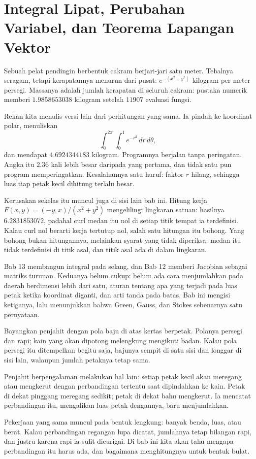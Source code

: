 \chapter[Integral Lipat dan Teorema Lapangan Vektor]{Integral Lipat, Perubahan Variabel, dan Teorema Lapangan Vektor}

Sebuah pelat pendingin berbentuk cakram berjari-jari satu meter. Tebalnya
seragam, tetapi kerapatannya menurun dari pusat: $e^{-(x^{2}+y^{2})}$ kilogram
per meter persegi. Massanya adalah jumlah kerapatan di seluruh cakram: pustaka numerik memberi
$1.9858653038$ kilogram setelah $11907$ evaluasi fungsi.

Rekan kita menulis versi lain dari perhitungan yang sama. Ia pindah ke
koordinat polar, menuliskan
\[
\int_{0}^{2\pi}\!\!\int_{0}^{1} e^{-r^{2}}\,dr\,d\theta ,
\]
dan mendapat $4.6924344183$ kilogram. Programnya berjalan tanpa peringatan.
Angka itu $2.36$ kali lebih besar daripada yang pertama, dan tidak satu pun
program memperingatkan. Kesalahannya satu huruf: faktor $r$ hilang, sehingga luas
tiap petak kecil dihitung terlalu besar.

Kerusakan sekelas itu muncul juga di sisi lain bab ini. Hitung kerja
$F(x,y)=(-y,x)/(x^{2}+y^{2})$ mengelilingi lingkaran satuan: hasilnya
$6.2831853072$, padahal curl medan itu nol di setiap titik tempat ia
terdefinisi. Kalau curl nol berarti kerja tertutup nol, salah satu hitungan
itu bohong. Yang bohong bukan hitungannya, melainkan syarat yang tidak
diperiksa: medan itu tidak terdefinisi di titik asal, dan titik asal ada di
dalam lingkaran.

Bab 13 membangun integral pada selang, dan Bab 12 memberi Jacobian sebagai
matriks turunan. Keduanya belum cukup: belum ada cara menjumlahkan pada daerah
berdimensi lebih dari satu, aturan tentang apa yang terjadi pada luas petak
ketika koordinat diganti, dan arti tanda pada batas. Bab ini mengisi
ketiganya, lalu menunjukkan bahwa Green, Gauss, dan Stokes sebenarnya satu
pernyataan.

\begin{untukanak}
Bayangkan penjahit dengan pola baju di atas kertas berpetak. Polanya persegi
dan rapi; kain yang akan dipotong melengkung mengikuti badan. Kalau pola persegi
itu ditempelkan begitu saja, bajunya sempit di satu sisi dan longgar di sisi
lain, walaupun jumlah petaknya tetap sama.

Penjahit berpengalaman melakukan hal lain: setiap petak kecil akan meregang
atau mengkerut dengan perbandingan tertentu saat dipindahkan ke kain. Petak di
dekat pinggang meregang sedikit; petak di dekat bahu mengkerut. Ia mencatat
perbandingan itu, mengalikan luas petak dengannya, baru menjumlahkan.

Pekerjaan yang sama muncul pada bentuk lengkung: banyak benda, luas, atau berat.
Kalau perbandingan regangan lupa dicatat, jumlahnya tetap bilangan rapi, dan
justru karena rapi ia sulit dicurigai. Di bab ini kita akan tahu mengapa
perbandingan itu harus ada, dan bagaimana menghitungnya untuk bentuk bulat.
\end{untukanak}

